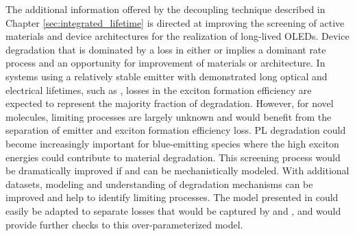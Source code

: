 \documentclass[../thesis.tex]{subfiles}
\begin{document}
The additional information offered by the decoupling technique described in Chapter \ref{sec:integrated_lifetime} is directed at improving the screening of active materials and device architectures for the realization of long-lived OLEDs.  
Device degradation that is dominated by a loss in either \ef  or \pl implies a dominant rate process and an opportunity for improvement of materials or architecture.  
In systems using a relatively stable emitter with demonstrated long optical and electrical lifetimes, such as \irppy,\supercite{Scholz2015} losses in the exciton formation efficiency are expected to represent the majority fraction of degradation.  
However, for novel molecules, limiting processes are largely unknown and would benefit from the separation of emitter and exciton formation efficiency loss.  
PL degradation could become increasingly important for blue-emitting species where the high exciton energies could contribute to material degradation.  \supercite{Scholz2015,Xu2016,Coburn2016a,Lee2015,Yi2016,Kim2008}
This screening process would be dramatically improved if \ef and \pl can be mechanistically modeled.  
With additional datasets, modeling and understanding of degradation mechanisms can be improved and help to identify limiting processes.
The model presented in \textcite{Giebink2008a} could easily be adapted to separate losses that would be captured by \pl and \ef, and would provide further checks to this over-parameterized model.


\end{document}
